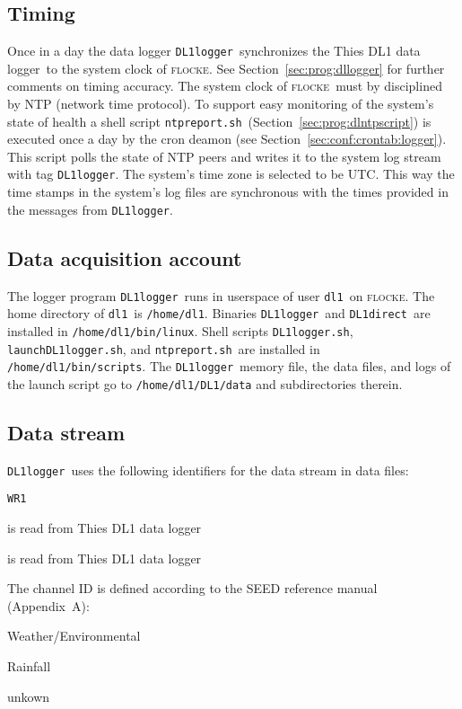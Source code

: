 \documentclass[twoside]{article}
\newcommand{\DTDL}{Thies DL1 data logger}
\newcommand{\Dlaunchscript}{\texttt{launchDL1logger.sh}}
\newcommand{\Dlogscript}{\texttt{DL1logger.sh}}
\newcommand{\Dntpscript}{\texttt{ntpreport.sh}}
\newcommand{\DLdirect}{\texttt{DL1direct}}
\newcommand{\DLlogger}{\texttt{DL1logger}}
\newcommand{\Dloggerhost}{\textsc{flocke}}
\newcommand{\Dloggeruser}{\texttt{dl1}}
\newcommand{\Dloggeruserhome}{\texttt{/home/dl1}}
\newcommand{\Dchannel}{\texttt{WR1}}
\begin{document}
\begin{multicols}{2}
\subsection{Timing}
Once in a day the data logger \DLlogger\ synchronizes the \DTDL\ to the system
clock of \Dloggerhost.
See Section~\ref{sec:prog:dllogger} for further comments on timing accuracy.
The system clock of \Dloggerhost\ must by disciplined by NTP (network time
protocol). 
To support easy monitoring of the system's state of health a shell script
\Dntpscript\ (Section~\ref{sec:prog:dlntpscript}) is executed once a day by
the cron deamon (see Section~\ref{sec:conf:crontab:logger}).
This script polls the state of NTP peers and writes it to the system log
stream with tag \DLlogger.
The system's time zone is selected to be UTC.
This way the time stamps in the system's log files are synchronous with the
times provided in the messages from \DLlogger.

\subsection{Data acquisition account}
The logger program \DLlogger\ runs in userspace of user \Dloggeruser\ on
\Dloggerhost. 
The home directory of \Dloggeruser\ is \Dloggeruserhome.
Binaries \DLlogger\ and \DLdirect\ are installed in
\Dloggeruserhome\texttt{/bin/linux}.
Shell scripts \Dlogscript, \Dlaunchscript, and \Dntpscript\ are installed in 
\Dloggeruserhome\texttt{/bin/scripts}.
The \DLlogger\ memory file, the data files, and logs of the launch script go
to \Dloggeruserhome\texttt{/DL1/data} and subdirectories therein.

\subsection{Data stream}
\DLlogger\ uses the following identifiers for the data stream in data files:
\vspace{-12pt}
\begin{description}
\parskip0pt
\itemsep0pt
\item[channel:] \Dchannel
\item[station:] is read from \DTDL
\item[instype:] is read from \DTDL
\end{description}
The channel ID is defined according to the SEED reference manual (Appendix~A):
\vspace{-12pt}
\begin{description}
\parskip0pt
\itemsep0pt
\item[Band code W:] Weather/Environmental
\item[Instrument Code R:] Rainfall
\item[Orientation Code:] unkown
\end{description}


\end{multicols}
\end{document}
